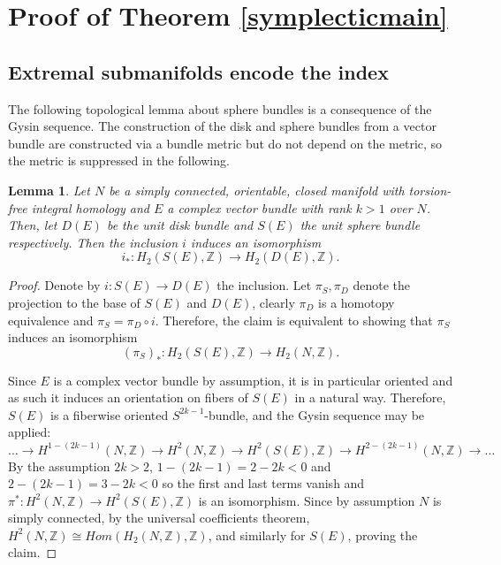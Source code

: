 \documentclass[12pt]{article}
\newtheorem{lemma}[theorem]{Lemma}
\begin{document}
\section{Proof of Theorem \ref{symplecticmain}} \label{proofsymplectic}
\subsection{Extremal submanifolds encode the index}
The following topological lemma about sphere bundles is a consequence of the Gysin sequence. The construction of the disk and sphere bundles from a vector bundle are constructed via a bundle metric but do not depend on the metric, so the metric is suppressed in the following.

\begin{lemma} \label{gysinlemma}
Let $N$ be a simply connected, orientable, closed manifold with torsion-free integral homology and $E$ a complex vector bundle with rank $k>1$ over $N$. Then, let $D(E)$ be the unit disk bundle and $S(E)$ the unit sphere bundle respectively. Then the inclusion $i$ induces an isomorphism $$i_{*} : H_{2}(S(E),\mathbb{Z}) \rightarrow  H_{2}(D(E),\mathbb{Z}). $$
\end{lemma}

\begin{proof}
Denote by $i: S(E) \rightarrow D(E)$ the inclusion. Let $\pi_{S},\pi_{D}$ denote the projection to the base of $S(E)$ and $D(E)$, clearly $\pi_{D}$ is a homotopy equivalence and $\pi_{S} =  \pi_{D}  \circ i$. Therefore, the claim is equivalent to showing that $\pi_{S} $ induces an isomorphism $$(\pi_{S})_{*} : H_{2}(S(E),\mathbb{Z}) \rightarrow  H_{2}(N,\mathbb{Z}). $$

Since $E$ is a complex vector bundle by assumption, it is in particular oriented and as such it induces an orientation on fibers of $S(E)$ in a natural way. Therefore, $S(E)$ is a fiberwise oriented $S^{2k-1}$-bundle, and the Gysin sequence may be applied:
$$\ldots  \rightarrow H^{1- (2k-1)}(N,\mathbb{Z}) \rightarrow H^2(N,\mathbb{Z}) \rightarrow H^{2}(S(E),\mathbb{Z}) \rightarrow  H^{2-(2k-1)}(N,\mathbb{Z})\rightarrow \ldots  $$
By the assumption $2k>2$, $1-(2k-1)= 2-2k<0$ and $2-(2k-1)= 3-2k<0$ so the first and last terms vanish and $\pi^* :  H^2(N,\mathbb{Z}) \rightarrow H^{2}(S(E),\mathbb{Z})$ is an isomorphism. Since by assumption $N$ is simply connected, by the universal coefficients theorem, $H^{2}(N,\mathbb{Z}) \cong Hom(H_{2}(N,\mathbb{Z}),\mathbb{Z})$, and similarly for $S(E)$, proving the claim.  \end{proof}
\end{document}
